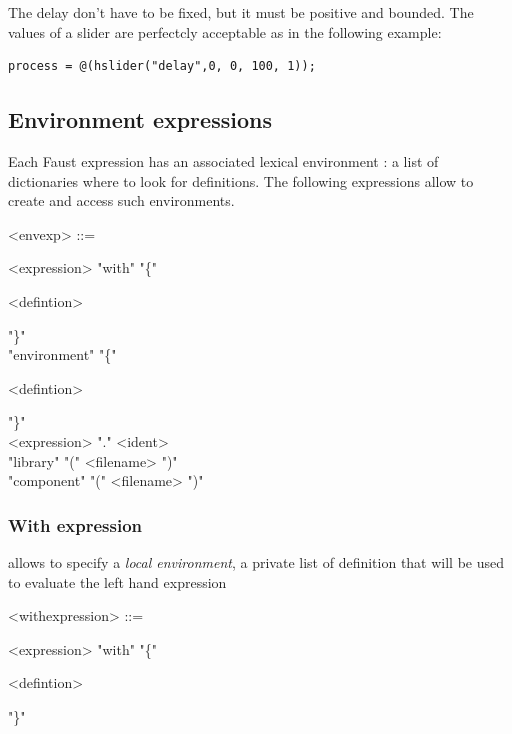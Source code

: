 \documentclass[a4paper]{book}
\begin{document}
The delay don't have to be fixed, but it must be positive and bounded. The values of a slider are perfectcly acceptable as in the following example:

\begin{lstlisting}
process = @(hslider("delay",0, 0, 100, 1));
\end{lstlisting}

\subsection{Environment expressions}
Each Faust expression has an associated lexical environment : a list of dictionaries where to look for definitions. The following expressions allow to create and access such environments.

\begin{grammar}
  <envexp> ::= 
  \begin{syntdiag}
    \begin{stack}
      <expression> "with" "\{"
        \begin{rep}
          <defintion>
        \end{rep}
        "\}" \\ 
      "environment" "\{"
        \begin{rep}
          <defintion>
        \end{rep}
        "\}" \\ 
      <expression> "." <ident> \\
      "library" "(" <filename> ")" \\
      "component" "(" <filename> ")"
    \end{stack}
  \end{syntdiag}
\end{grammar}

\subsubsection{With expression}allows to specify a \textit{local environment}, a private list of definition that will be used to evaluate the left hand expression

\begin{grammar}
  <withexpression> ::= 
  \begin{syntdiag}
      <expression> "with" "\{"
        \begin{rep}
          <defintion>
        \end{rep}
        "\}"
  \end{syntdiag}
\end{grammar}
\end{document}
